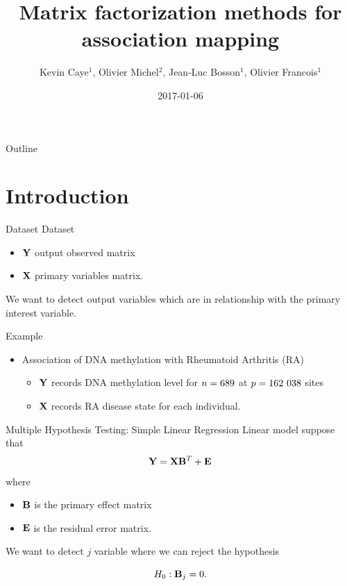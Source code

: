 \documentclass[presentation]{beamer}
\author{Kevin Caye\(^{1}\), Olivier Michel\(^{2}\), Jean-Luc Bosson\(^{1}\), Olivier Francois\(^{1}\)}
\date{2017-01-06}
\title{Matrix factorization methods for association mapping}
\institute{$^{1}$ TIMC-IMAG, $^{2}$ GIPSA-lab}
\begin{document}
\maketitle
\begin{frame}{Outline}
\tableofcontents
\end{frame}


\section{Introduction}
\label{sec:org7357c21}

\begin{frame}[label={sec:org7768154}]{Dataset}
\alert{Dataset}
\begin{itemize}
\item \(\mathbf{Y}\) output observed matrix
\item \(\mathbf{X}\) primary variables matrix.
\end{itemize}

\alert{We want} to detect output variables which are in relationship with the primary
interest variable.

\alert{Example}
\begin{itemize}
\item Association of DNA methylation with Rheumatoid Arthritis (RA) \cite{Liu_2013}
\begin{itemize}
\item \(\mathbf{Y}\) records DNA methylation level for \(n = 689\) at \(p = 162~038\)
sites
\item \(\mathbf{X}\) records RA disease state for each individual.
\end{itemize}
\end{itemize}
\end{frame}

\begin{frame}[label={sec:org0bcc100}]{Multiple Hypothesis Testing: Simple Linear Regression}
Linear model suppose that
    $$\mathbf{Y} =  \mathbf{X} \mathbf{B}^{T} + \mathbf{E}$$
  where
\begin{itemize}
\item \(\mathbf{B}\) is the primary effect matrix
\item \(\mathbf{E}\) is the residual error matrix.
\end{itemize}

We want to detect \(j\) variable where we can reject the hypothesis 

$$ H_0: \mathbf{B}_j = 0.$$
\end{frame}
\end{document}
